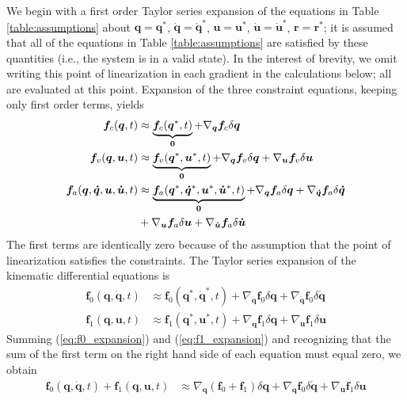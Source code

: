 \documentclass[smallcondensed,final]{svjour3}                     %
\begin{document}
We begin with a first order Taylor series expansion of the equations in Table
\ref{table:assumptions} about $\bm{q}=\bm{q}^*$, $\bm{\dot{q}}=\bm{\dot{q}}^*$,
$\bm{u}=\bm{u}^*$, $\bm{\dot{u}}=\bm{\dot{u}}^*$, $\bm{r}=\bm{r}^*$; it is
assumed that all of the equations in Table \ref{table:assumptions} are
satisfied by these quantities (i.e., the system is in a valid state).  In the
interest of brevity, we omit writing this point of linearization in each
gradient in the calculations below; all are evaluated at this point. Expansion
of the three constraint equations, keeping only first order terms, yields
\begin{align}
  \label{eq:configuration_expansion}
  \bm{f}_{c}(\bm{q}, t) &\approx \underbrace{\bm{f}_{c}(\bm{q}^*, t)}_{\bm{0}} +
  \nabla_{\bm{q}}\bm{f}_{c} \delta \bm{q}\\
  \label{eq:velocity_expansion}
  \bm{f}_{v}(\bm{q}, \bm{u}, t) &\approx \underbrace{\bm{f}_{v}(\bm{q}^*,
  \bm{u}^*, t)}_{\bm{0}} +  \nabla_{\bm{q}}\bm{f}_{v} \delta \bm{q} +
  \nabla_{\bm{u}}\bm{f}_{v} \delta \bm{u} \\
  \label{eq:acceleration_expansion}
  \bm{f}_{a}(\bm{q}, \bm{\dot{q}}, \bm{u}, \bm{\dot{u}}, t) &\approx
  \underbrace{\bm{f}_{a}(\bm{q}^*, \bm{\dot{q}}^*, \bm{u}^*, \bm{\dot{u}}^*,
t)}_{\bm{0}} +  \nabla_{\bm{q}}\bm{f}_{a} \delta \bm{q} +
\nabla_{\bm{\dot{q}}}\bm{f}_{a}
 \delta \bm{\dot{q}} \notag\\
&+ \nabla_{\bm{u}}\bm{f}_{a} \delta \bm{u} + \nabla_{\bm{\dot{u}}}\bm{f}_{a}
\delta \bm{\dot{u}}
\end{align}
The first terms are identically zero because of the assumption that the
point of linearization satisfies the constraints.  The Taylor series expansion
of the kinematic differential equations is
\begin{align}
  \label{eq:f0_expansion}
  \bm{f}_{0}(\bm{q}, \bm{\dot{q}}, t) &\approx \bm{f}_{0}(\bm{q}^*,
  \bm{\dot{q}}^*, t) + \nabla_{\bm{q}}\bm{f}_{0} \delta\bm{q} +
  \nabla_{\bm{\dot{q}}}\bm{f}_{0} \delta\bm{\dot{q}}\\
  \label{eq:f1_expansion}
  \bm{f}_{1}(\bm{q}, \bm{u}, t) &\approx \bm{f}_{1}(\bm{q}^*,
  \bm{u}^*, t) + \nabla_{\bm{q}}\bm{f}_{1} \delta\bm{q} +
  \nabla_{\bm{u}}\bm{f}_{1} \delta\bm{u}
\end{align}
Summing (\ref{eq:f0_expansion}) and (\ref{eq:f1_expansion}) and recognizing
that the sum of the first term on the right hand side of each equation must
equal zero, we obtain
\begin{align}
  \label{eq:f0_plus_f1_expansion}
  \bm{f}_{0}(\bm{q}, \bm{\dot{q}}, t) + \bm{f}_{1}(\bm{q}, \bm{u}, t) &\approx
  \nabla_{\bm{q}}(\bm{f}_{0} + \bm{f}_{1}) \delta\bm{q} +
  \nabla_{\bm{\dot{q}}}\bm{f}_{0} \delta\bm{\dot{q}} +
  \nabla_{\bm{u}}\bm{f}_{1} \delta\bm{u}
\end{align}
\end{document}
